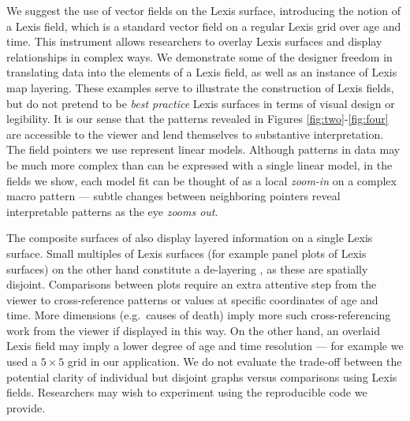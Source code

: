 \documentclass[10pt, twoside, parskip=half]{article}
\begin{document}
We suggest the use of vector fields on the Lexis surface, introducing the notion of a Lexis field, which is a standard vector field on a regular Lexis grid over age and time. This instrument allows researchers to overlay Lexis surfaces and display relationships in complex ways. We demonstrate some of the designer freedom in translating data into the elements of a Lexis field, as well as an instance of Lexis map layering. These examples serve to illustrate the construction of Lexis fields, but do not pretend to be \emph{best practice} Lexis surfaces in terms of visual design or legibility. It is our sense that the patterns revealed in Figures \ref{fig:two}-\ref{fig:four} are accessible to the viewer and lend themselves to substantive interpretation. The field pointers we use represent linear models. Although patterns in data may be much more complex than can be expressed with a single linear model, in the fields we show, each model fit can be thought of as a local \emph{zoom-in} on a complex macro pattern --- subtle changes between neighboring pointers reveal interpretable patterns as the eye \emph{zooms out}.

The composite surfaces of \citet{scholey2017visualizing} also display layered information on a single Lexis surface. Small multiples of Lexis surfaces (for example panel plots of Lexis surfaces) on the other hand constitute a de-layering \citep[e.g][or \citet{kashnitsky2019geofaceting}]{remund2018cause}, as these are spatially disjoint. Comparisons between plots require an extra attentive step from the viewer to cross-reference patterns or values at specific coordinates of age and time. More dimensions (e.g.~causes of death) imply more such cross-referencing work from the viewer if displayed in this way. On the other hand, an overlaid Lexis field may imply a lower degree of age and time resolution --- for example we used a \(5\times 5\) grid in our application. We do not evaluate the trade-off between the potential clarity of individual but disjoint graphs versus comparisons using Lexis fields. Researchers may wish to experiment using the reproducible code we provide.
\end{document}
